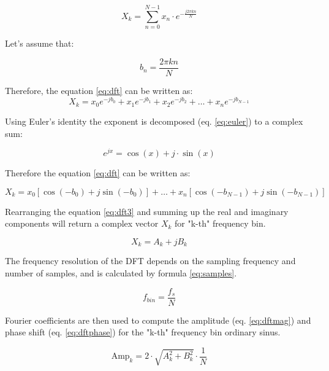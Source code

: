 \begin{equation} \label{eq:dft}
X_k = \sum_{n=0}^{N-1} x_n \cdot e^{-\frac{j2 \pi kn}{N}}
\end{equation}

Let's assume that:

\begin{equation} \label{eq:bn}
b_n = \frac{2 \pi k n}{N}
\end{equation}

Therefore, the equation \ref{eq:dft} can be written as:
\begin{equation} \label{eq:dft2}
X_k = x_{0} e^{-j b_{0}} + x_{1} e^{-j b_{1}} + x_{2} e^{-j b_{2}} + \ldots + x_{n} e^{-j b_{N-1}}
\end{equation}

Using Euler's identity the exponent is decomposed (eq. \ref{eq:euler}) to a complex sum:

\begin{equation} \label{eq:euler}
e^{jx} = \cos(x) + j \cdot \sin(x)
\end{equation}

Therefore the equation \ref{eq:dft} can be written as:

\begin{equation} \label{eq:dft3}
X_k = x_0 [\cos(-b_{0}) + j \sin(-b_{0})] +  \ldots + x_n [\cos(-b_{N-1}) + j \sin(-b_{N-1})]
\end{equation}

Rearranging the equation \ref{eq:dft3} and summing up the real and imaginary components will return a complex vector $X_k$ for "k-th" frequency bin.

\begin{equation} \label{eq:complex}
X_k = A_k + j B_{k}
\end{equation}
 
The frequency resolution of the DFT depends on the sampling frequency and number of samples, and is calculated by formula \ref{eq:samples}. 

\begin{equation} \label{eq:samples}
f_{bin} = \frac{f_{s}}{N}
\end{equation}

Fourier coefficients are then used to compute the amplitude (eq. \ref{eq:dftmag}) and phase shift (eq. \ref{eq:dftphase}) for the "k-th" frequency bin ordinary sinus.

\begin{equation} \label{eq:dftmag}
\text{Amp}_k = 2 \cdot \sqrt{A_{k}^{2} + B_{k}^{2}} \cdot \frac{1}{N}
\end{equation}


